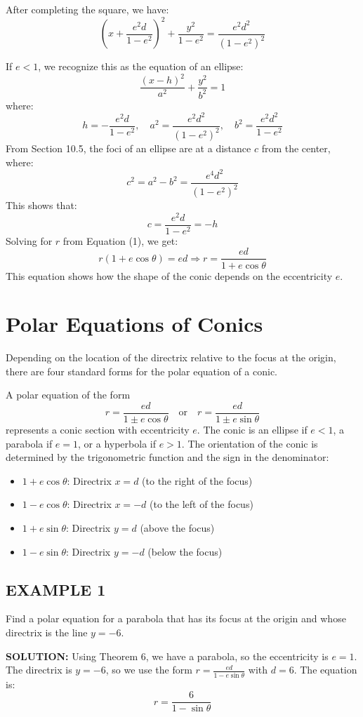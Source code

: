 \documentclass{article}
\begin{document}
After completing the square, we have:
\[
\left(x + \frac{e^2d}{1 - e^2}\right)^2 + \frac{y^2}{1 - e^2} = \frac{e^2d^2}{(1 - e^2)^2}
\]

If $e < 1$, we recognize this as the equation of an ellipse:
\[
\frac{(x - h)^2}{a^2} + \frac{y^2}{b^2} = 1
\]
where:
\[
h = -\frac{e^2d}{1 - e^2}, \quad a^2 = \frac{e^2d^2}{(1 - e^2)^2}, \quad b^2 = \frac{e^2d^2}{1 - e^2}
\]
From Section 10.5, the foci of an ellipse are at a distance $c$ from the center, where:
\[
c^2 = a^2 - b^2 = \frac{e^4d^2}{(1 - e^2)^2}
\]
This shows that:
\[
c = \frac{e^2d}{1 - e^2} = -h
\]
Solving for $r$ from Equation (1), we get:
\[
r(1 + e \cos\theta) = ed \Rightarrow r = \frac{ed}{1 + e \cos\theta}
\]
This equation shows how the shape of the conic depends on the eccentricity $e$.

\section*{Polar Equations of Conics}
Depending on the location of the directrix relative to the focus at the origin, there are four standard forms for the polar equation of a conic.

A polar equation of the form
\[
r = \frac{ed}{1 \pm e \cos\theta} \quad \text{or} \quad r = \frac{ed}{1 \pm e \sin\theta}
\]
represents a conic section with eccentricity $e$. The conic is an ellipse if $e < 1$, a parabola if $e = 1$, or a hyperbola if $e > 1$. The orientation of the conic is determined by the trigonometric function and the sign in the denominator:
\begin{itemize}
    \item $1 + e \cos\theta$: Directrix $x = d$ (to the right of the focus)
    \item $1 - e \cos\theta$: Directrix $x = -d$ (to the left of the focus)
    \item $1 + e \sin\theta$: Directrix $y = d$ (above the focus)
    \item $1 - e \sin\theta$: Directrix $y = -d$ (below the focus)
\end{itemize}

\subsection*{EXAMPLE 1}
Find a polar equation for a parabola that has its focus at the origin and whose directrix is the line $y = -6$.

\textbf{SOLUTION:}
Using Theorem 6, we have a parabola, so the eccentricity is $e = 1$. The directrix is $y = -6$, so we use the form $r = \frac{ed}{1 - e \sin\theta}$ with $d = 6$. The equation is:
\[
r = \frac{6}{1 - \sin\theta}
\]
\end{document}
